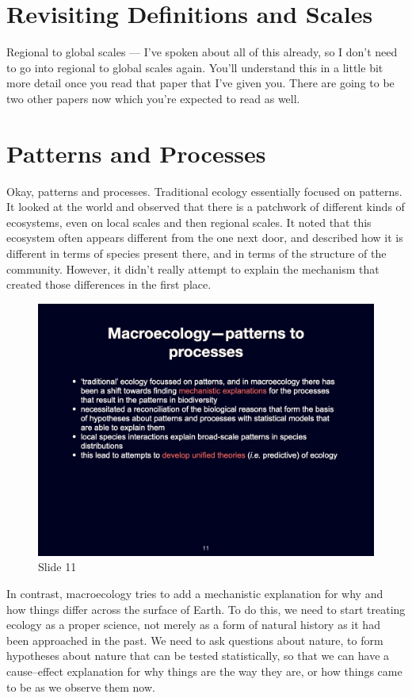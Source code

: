 \documentclass[
  10pt,
]{book}
\begin{document}
\section{Revisiting Definitions and
Scales}\label{revisiting-definitions-and-scales}

Regional to global scales --- I've spoken about all of this already, so
I don't need to go into regional to global scales again. You'll
understand this in a little bit more detail once you read that paper
that I've given you. There are going to be two other papers now which
you're expected to read as well.

\section{Patterns and Processes}\label{patterns-and-processes}

Okay, patterns and processes. Traditional ecology essentially focused on
patterns. It looked at the world and observed that there is a patchwork
of different kinds of ecosystems, even on local scales and then regional
scales. It noted that this ecosystem often appears different from the
one next door, and described how it is different in terms of species
present there, and in terms of the structure of the community. However,
it didn't really attempt to explain the mechanism that created those
differences in the first place.

\begin{figure}[ht]
\centering
\includegraphics[width=0.8\linewidth]{../images/BDC334/BDC334-011.jpeg}
\caption*{Slide 11}
\end{figure}

In contrast, macroecology tries to add a mechanistic explanation for why
and how things differ across the surface of Earth. To do this, we need
to start treating ecology as a proper science, not merely as a form of
natural history as it had been approached in the past. We need to ask
questions about nature, to form hypotheses about nature that can be
tested statistically, so that we can have a cause--effect explanation
for why things are the way they are, or how things came to be as we
observe them now.
\end{document}
